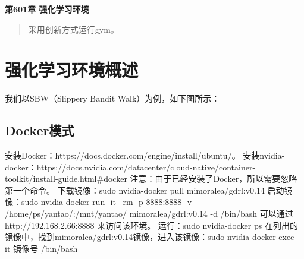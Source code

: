\newpage
\maketitle
\begin{center}
\Large \textbf{第601章 强化学习环境} \quad 
\end{center}
\begin{abstract}
采用创新方式运行gym。
\end{abstract}
\section{强化学习环境概述}
我们以SBW（Slippery Bandit Walk）为例，如下图所示：
\subsection{Docker模式}
安装Docker：https://docs.docker.com/engine/install/ubuntu/。
安装nvidia-docker：https://docs.nvidia.com/datacenter/cloud-native/container-toolkit/install-guide.html#docker 注意：由于已经安装了Docker，所以需要忽略第一个命令。
下载镜像：sudo nvidia-docker pull mimoralea/gdrl:v0.14
启动镜像：sudo nvidia-docker run -it --rm -p 8888:8888 -v /home/ps/yantao/:/mnt/yantao/ mimoralea/gdrl:v0.14 -d /bin/bash
可以通过 http://192.168.2.66:8888 来访问该环境。
运行：sudo nvidia-docker ps
在列出的镜像中，找到mimoralea/gdrl:v0.14镜像，进入该镜像：sudo nvidia-docker exec -it 镜像号 /bin/bash